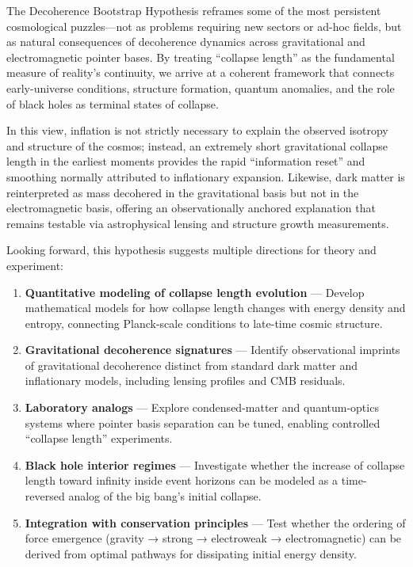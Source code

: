 \documentclass[
]{article}
\providecommand{\tightlist}{%
  \setlength{\itemsep}{0pt}\setlength{\parskip}{0pt}}
\begin{document}
The Decoherence Bootstrap Hypothesis reframes some of the most
persistent cosmological puzzles---not as problems requiring new sectors
or ad-hoc fields, but as natural consequences of decoherence dynamics
across gravitational and electromagnetic pointer bases. By treating
``collapse length'' as the fundamental measure of reality's continuity,
we arrive at a coherent framework that connects early-universe
conditions, structure formation, quantum anomalies, and the role of
black holes as terminal states of collapse.

In this view, inflation is not strictly necessary to explain the
observed isotropy and structure of the cosmos; instead, an extremely
short gravitational collapse length in the earliest moments provides the
rapid ``information reset'' and smoothing normally attributed to
inflationary expansion. Likewise, dark matter is reinterpreted as mass
decohered in the gravitational basis but not in the electromagnetic
basis, offering an observationally anchored explanation that remains
testable via astrophysical lensing and structure growth measurements.

Looking forward, this hypothesis suggests multiple directions for theory
and experiment:

\begin{enumerate}
\def\labelenumi{\arabic{enumi}.}
\tightlist
\item
  \textbf{Quantitative modeling of collapse length evolution} ---
  Develop mathematical models for how collapse length changes with
  energy density and entropy, connecting Planck-scale conditions to
  late-time cosmic structure.
\item
  \textbf{Gravitational decoherence signatures} --- Identify
  observational imprints of gravitational decoherence distinct from
  standard dark matter and inflationary models, including lensing
  profiles and CMB residuals.
\item
  \textbf{Laboratory analogs} --- Explore condensed-matter and
  quantum-optics systems where pointer basis separation can be tuned,
  enabling controlled ``collapse length'' experiments.
\item
  \textbf{Black hole interior regimes} --- Investigate whether the
  increase of collapse length toward infinity inside event horizons can
  be modeled as a time-reversed analog of the big bang's initial
  collapse.
\item
  \textbf{Integration with conservation principles} --- Test whether the
  ordering of force emergence (gravity → strong → electroweak →
  electromagnetic) can be derived from optimal pathways for dissipating
  initial energy density.
\end{enumerate}
\end{document}
